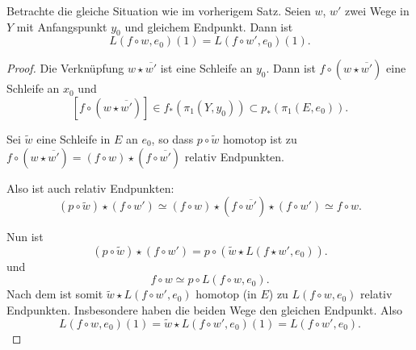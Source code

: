 
\begin{lemma*}\label{lm:hilfslemma:wege-mit-gleichem-endpunkt-werden-auf-gleiche-endpunkte-geliftet}
    Betrachte die gleiche Situation wie im vorherigem Satz. Seien $w$, $w'$ zwei Wege in $Y$ mit Anfangspunkt  $y_0$ und gleichem Endpunkt. Dann ist
    \[
        L(f \circ  w,e_0)(1) = L(f \circ w',e_0)(1)
    .\] 
\end{lemma*}

\begin{proof}
    Die Verknüpfung $w \star \overline{w'}$ ist eine Schleife an $y_0$. Dann ist $f\circ (w \star \overline{w'})$ eine Schleife an $x_0$ und
    \[
        [f \circ (w\star \overline{w'})] \in f_*(\pi_1(Y,y_0)) \subset p_*(\pi_1(E,e_0))
    .\] 

Sei $\tilde{w}$ eine Schleife in $E$ an  $e_0$, so dass $p \circ  \tilde{w}$ homotop ist zu $f \circ  (w \star \overline{w'}) = (f \circ  w) \star ( f \circ  \overline{w'})$ relativ Endpunkten.

Also ist auch relativ Endpunkten:
\[
    (p \circ  \tilde{w}) \star (f \circ  w') \simeq (f \circ  w) \star (f \circ  \overline{w'}) \star (f \circ  w') \simeq f \circ  w
.\] 

Nun ist
\[
    (p \circ  \tilde{w}) \star (f \circ  w') = p \circ (\tilde{w} \star L(f \star w', e_0))
.\] 
und
\[
    f \circ  w \simeq p \circ  L(f \circ  w,e_0)
.\] 
Nach dem  ist somit $\tilde{w} \star L(f \circ  w', e_0)$ homotop (in $E$) zu  $L(f \circ  w, e_0)$ relativ Endpunkten. Insbesondere haben die beiden Wege den gleichen Endpunkt. Also
\[
    L(f \circ  w, e_0)(1) = \tilde{w} \star L(f \circ  w', e_0)(1) = L(f \circ  w', e_0)
.\] 

\end{proof}

